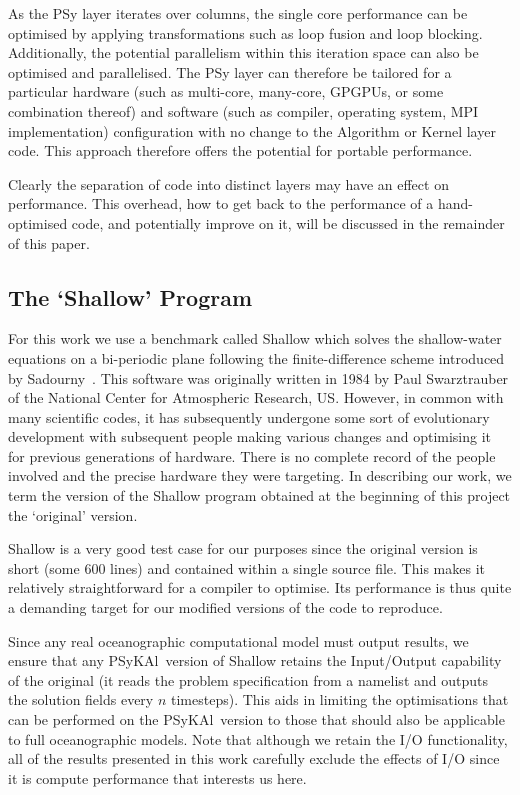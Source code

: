 \documentclass{IOS-Book-Article}
\newcommand{\psykal}{{PS}y{KA}l}
\begin{document}
As the PSy layer iterates over columns, the single core performance
can be optimised by applying transformations such as loop fusion and
loop blocking. Additionally, the potential parallelism within this
iteration space can also be optimised and parallelised. The PSy layer
can therefore be tailored for a particular hardware (such as
multi-core, many-core, GPGPUs, or some combination thereof) and
software (such as compiler, operating system, MPI implementation)
configuration with no change to the Algorithm or Kernel layer
code. This approach therefore offers the potential for portable
performance.

Clearly the separation of code into distinct layers may have an effect
on performance. This overhead, how to get back to the performance
of a hand-optimised code, and potentially improve on it, will be
discussed in the remainder of this paper.

\subsection*{The `Shallow' Program}

For this work we use a benchmark called Shallow which solves the
shallow-water equations on a bi-periodic plane following the
finite-difference scheme introduced by Sadourny~\cite{sadourny75}.
This software was originally written in 1984 by Paul Swarztrauber of
the National Center for Atmospheric Research, US.  However, in common
with many scientific codes, it has subsequently undergone some sort of
evolutionary development with subsequent people making various changes
and optimising it for previous generations of hardware.  There is no
complete record of the people involved and the precise hardware they
were targeting. In describing our work, we term the version of the
Shallow program obtained at the beginning of this project the
`original' version.

Shallow is a very good test case for our purposes since the original
version is short (some 600 lines) and contained within a single source
file. This makes it relatively straightforward for a compiler to
optimise. Its performance is thus quite a demanding target for our
modified versions of the code to reproduce.

Since any real oceanographic computational model must output results,
we ensure that any \psykal\ version of Shallow retains the Input/Output
capability of the original (it reads the problem specification from a
namelist and outputs the solution fields every $n$ timesteps). This
aids in limiting the optimisations that can be performed on the
\psykal\ version to those that should also be applicable to full
oceanographic models. Note that although we retain the I/O
functionality, all of the results presented in this work carefully
exclude the effects of I/O since it is compute performance that
interests us here.
\end{document}
